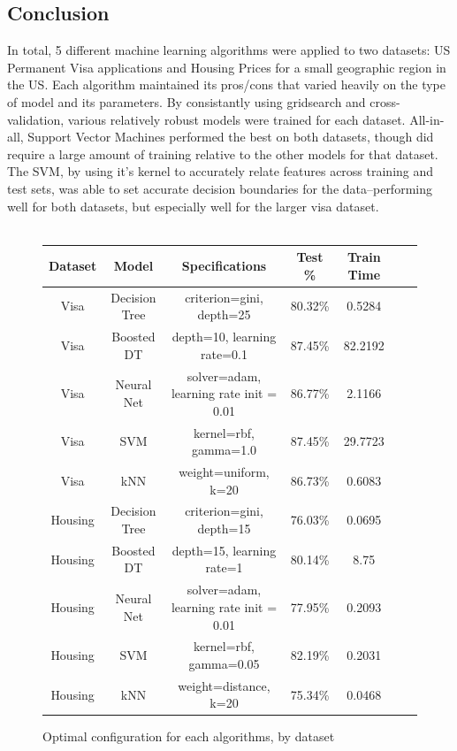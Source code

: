 \documentclass[h]{article}
\begin{document}
\subsection*{Conclusion}
In total, 5 different machine learning algorithms were applied to two datasets: 
US Permanent Visa applications and Housing Prices for a small geographic region 
in the US.  Each algorithm maintained its pros/cons that varied heavily on the 
type of model and its parameters.  By consistantly using gridsearch and 
cross-validation, various relatively robust models were trained for each 
dataset.  All-in-all, Support Vector Machines performed the best on both 
datasets, though did require a large amount of training relative to the other 
models for that dataset.  The SVM, by using it's kernel to accurately relate features across training and test sets, 
was able to set accurate decision boundaries for the data--performing well for 
both datasets, but especially well for the larger visa dataset.
\\ \\
\begin{figure}[H]
\begin{tabular}{ | c | c  | c | c | c | c | c |} 
\hline

\textbf{Dataset} & \textbf{Model} & \textbf{Specifications} & \textbf{Test \%} & \textbf{Train Time}   \\ \hline
Visa & Decision Tree & criterion=gini, depth=25 &  80.32\% & 0.5284 \\ \hline
Visa & Boosted DT & depth=10, learning rate=0.1 & 87.45\% & 82.2192 \\ \hline
Visa & Neural Net & solver=adam, learning rate init = 0.01 & 86.77\% & 2.1166 \\ \hline
Visa & SVM & kernel=rbf, gamma=1.0 & 87.45\% & 29.7723 \\ \hline
Visa & kNN & weight=uniform, k=20 & 86.73\% & 0.6083  \\ \hline

Housing & Decision Tree & criterion=gini, depth=15 & 76.03\% & 0.0695  \\ \hline
Housing & Boosted DT & depth=15, learning rate=1 & 80.14\% & 8.75  \\ \hline
Housing & Neural Net & solver=adam, learning rate init = 0.01 & 77.95\% & 0.2093 \\ \hline
Housing & SVM & kernel=rbf, gamma=0.05 & 82.19\% & 0.2031  \\ \hline
Housing & kNN & weight=distance, k=20 & 75.34\% & 0.0468  \\ \hline
\hline
\end{tabular}
\caption*{Optimal configuration for each algorithms, by dataset}
   \endminipage\hfill
\end{figure}
\end{document}
